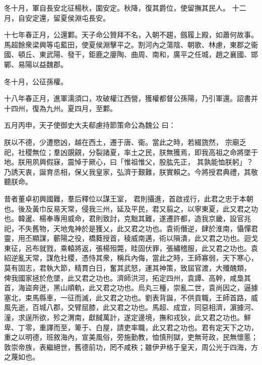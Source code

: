 \begin{pinyinscope}
冬十月，軍自長安北征楊秋，圍安定。秋降，復其爵位，使留撫其民人。
十二月，自安定還，留夏侯淵屯長安。


十七年春正月，公還鄴。天子命公贊拜不名，入朝不趨，劔履上殿，如蕭何故事。馬超餘衆梁興等屯藍田，使夏侯淵擊平之。割河內之蕩陰、朝歌、林慮，東郡之衞國、頓丘、東武陽、發干，鉅鹿之廮陶、曲周、南和，廣平之任城，趙之襄國、邯鄲、易陽以益魏郡。


冬十月，公征孫權。


十八年春正月，進軍濡須口，攻破權江西營，獲權都督公孫陽，乃引軍還。詔書并十四州，復為九州。夏四月，至鄴。


五月丙申，天子使御史大夫郗慮持節策命公為魏公
曰：


朕以不德，少遭愍凶，越在西土，遷于唐、衞。當此之時，若綴旒然，
宗廟乏祀，社稷無位；羣凶覬覦，分裂諸夏，率土之民，朕無獲焉，即我高祖之命將墜于地。朕用夙興假寐，震悼于厥心，曰「惟祖惟父，股肱先正，
其孰能恤朕躬」？乃誘天衷，誕育丞相，保乂我皇家，弘濟于艱難，朕實賴之。今將授君典禮，其敬聽朕命。


昔者董卓初興國難，羣后釋位以謀王室，
君則攝進，首啟戎行，此君之忠于本朝也。後及黃巾反易天常，侵我三州，延及平民，君又翦之，以寧東夏，此又君之功也。韓暹、楊奉專用威命，君則致討，克黜其難，遂遷許都，造我京畿，設官兆祀，不失舊物，天地鬼神於是獲乂，此又君之功也。袁術僭逆，肆於淮南，懾憚君靈，用丕顯謀，蘄陽之役，橋蕤授首，稜威南邁，術以隕潰，此又君之功也。迴戈東征，呂布就戮，乘轅將返，張楊殂斃，眭固伏罪，張繡稽服，此又君之功也。袁紹逆亂天常，謀危社稷，憑恃其衆，稱兵內侮，當此之時，王師寡弱，天下寒心，莫有固志，君執大節，精貫白日，奮其武怒，運其神策，致屆官渡，大殲醜類，
俾我國家拯於危墜，此又君之功也。濟師洪河，拓定四州，袁譚、高幹，咸梟其首，海盜奔迸，黑山順軌，此又君之功也。烏丸三種，崇亂二世，袁尚因之，逼據塞北，束馬縣車，一征而滅，此又君之功也。劉表背誕，不供貢職，王師首路，威風先逝，百城八郡，交臂屈膝，此又君之功也。馬超、成宜，同惡相濟，濵據河、潼，求逞所欲，殄之渭南，獻馘萬計，遂定邊境，撫和戎狄，此又君之功也。鮮卑、丁零，重譯而至，箄于、白屋，請吏率職，此又君之功也。君有定天下之功，重之以明德，班敘海內，宣美風俗，旁施勤教，恤慎刑獄，吏無苛政，民無懷慝；敦崇帝族，表繼絕世，舊德前功，罔不咸秩；雖伊尹格于皇天，周公光于四海，方之蔑如也。



\end{pinyinscope}
